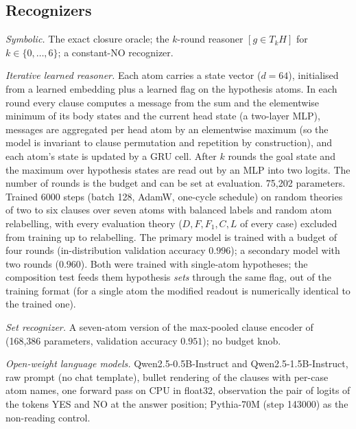 \subsection{Recognizers}\label{recognizers}

\emph{Symbolic.} The exact closure oracle; the \(k\)-round reasoner \([g\in T_kH]\) for \(k\in\{0,\dots,6\}\); a constant-NO recognizer.

\emph{Iterative learned reasoner.} Each atom carries a state vector (\(d=64\)), initialised from a learned embedding plus a learned flag on the hypothesis atoms. In each round every clause computes a message from the sum and the elementwise minimum of its body states and the current head state (a two-layer MLP), messages are aggregated per head atom by an elementwise maximum (so the model is invariant to clause permutation and repetition by construction), and each atom's state is updated by a GRU cell. After \(k\) rounds the goal state and the maximum over hypothesis states are read out by an MLP into two logits. The number of rounds is the budget and can be set at evaluation. 75,202 parameters. Trained 6000 steps (batch 128, AdamW, one-cycle schedule) on random theories of two to six clauses over seven atoms with balanced labels and random atom relabelling, with every evaluation theory (\(D,F,F_1,C,L\) of every case) excluded from training up to relabelling. The primary model is trained with a budget of four rounds (in-distribution validation accuracy \(0.996\)); a secondary model with two rounds (\(0.960\)). Both were trained with single-atom hypotheses; the composition test feeds them hypothesis \emph{sets} through the same flag, out of the training format (for a single atom the modified readout is numerically identical to the trained one).

\emph{Set recognizer.} A seven-atom version of the max-pooled clause encoder of \cite{ppi2026} (168,386 parameters, validation accuracy \(0.951\)); no budget knob.

\emph{Open-weight language models.} Qwen2.5-0.5B-Instruct and Qwen2.5-1.5B-Instruct, raw prompt (no chat template), bullet rendering of the clauses with per-case atom names, one forward pass on CPU in float32, observation the pair of logits of the tokens YES and NO at the answer position; Pythia-70M (step 143000) as the non-reading control.

